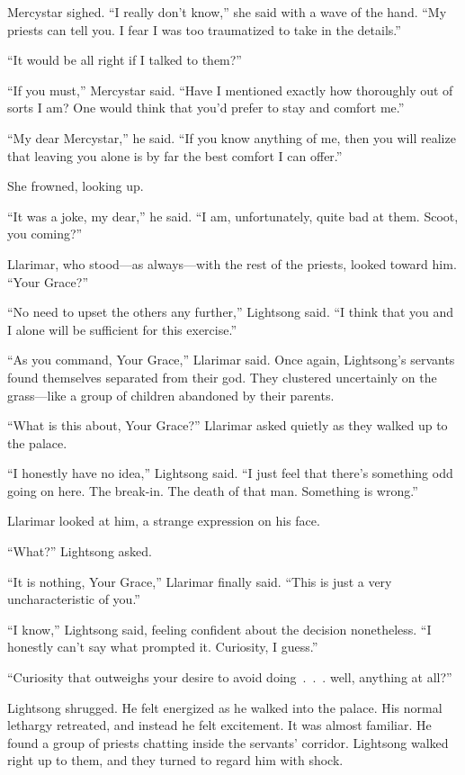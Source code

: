 Mercystar sighed. “I really don’t know,” she said with a wave of the hand. “My priests can tell you. I fear I was too traumatized to take in the details.”

“It would be all right if I talked to them?”

“If you must,” Mercystar said. “Have I mentioned exactly how thoroughly out of sorts I am? One would think that you’d prefer to stay and comfort me.”

“My dear Mercystar,” he said. “If you know anything of me, then you will realize that leaving you alone is by far the best comfort I can offer.”

She frowned, looking up.

“It was a joke, my dear,” he said. “I am, unfortunately, quite bad at them. Scoot, you coming?”

Llarimar, who stood—as always—with the rest of the priests, looked toward him. “Your Grace?”

“No need to upset the others any further,” Lightsong said. “I think that you and I alone will be sufficient for this exercise.”

“As you command, Your Grace,” Llarimar said. Once again, Lightsong’s servants found themselves separated from their god. They clustered uncertainly on the grass—like a group of children abandoned by their parents.

“What is this about, Your Grace?” Llarimar asked quietly as they walked up to the palace.

“I honestly have no idea,” Lightsong said. “I just feel that there’s something odd going on here. The break-in. The death of that man. Something is wrong.”

Llarimar looked at him, a strange expression on his face.

“What?” Lightsong asked.

“It is nothing, Your Grace,” Llarimar finally said. “This is just a very uncharacteristic of you.”

“I know,” Lightsong said, feeling confident about the decision nonetheless. “I honestly can’t say what prompted it. Curiosity, I guess.”

“Curiosity that outweighs your desire to avoid doing~.~.~. well, anything at all?”

Lightsong shrugged. He felt energized as he walked into the palace. His normal lethargy retreated, and instead he felt excitement. It was almost familiar. He found a group of priests chatting inside the servants’ corridor. Lightsong walked right up to them, and they turned to regard him with shock.


